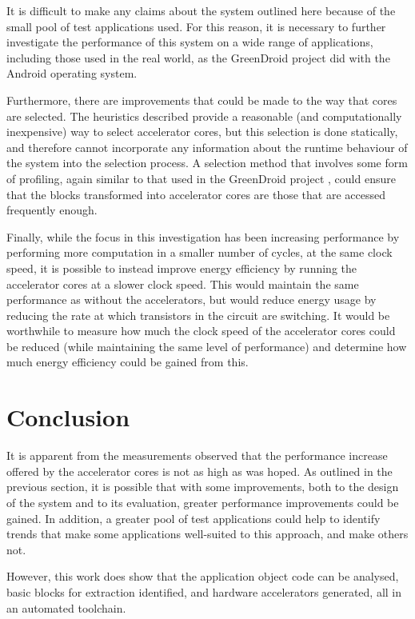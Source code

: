 \documentclass{UoYCSproject}
\begin{document}
It is difficult to make any claims about the system outlined here because of the small pool of test applications used.
For this reason, it is necessary to further investigate the performance of this system on a wide range of applications,
including those used in the real world, as the GreenDroid project \cite{greendroid} did with the Android operating system.

Furthermore, there are improvements that could be made to the way that cores are selected. The heuristics described provide
a reasonable (and computationally inexpensive) way to select accelerator cores, but this selection is done statically, and
therefore cannot incorporate any information about the runtime behaviour of the system into the selection process.
A selection method that involves some form of profiling, again similar to that used in the GreenDroid project \cite{greendroid},
could ensure that the blocks transformed into accelerator cores are those that are accessed frequently enough.

Finally, while the focus in this investigation has been increasing performance by performing more
computation in a smaller number of cycles, at the same clock speed, it is possible to instead improve
energy efficiency by running the accelerator cores at a slower clock speed. This would maintain the same
performance as without the accelerators, but would reduce energy usage by reducing the rate at which
transistors in the circuit are switching. It would be worthwhile to measure how much the clock speed
of the accelerator cores could be reduced (while maintaining the same level of performance) and determine
how much energy efficiency could be gained from this.

\section{Conclusion}

It is apparent from the measurements observed that the performance increase offered by the accelerator cores is not
as high as was hoped. As outlined in the previous section, it is possible that with some improvements,
both to the design of the system and to its evaluation, greater performance improvements could be gained.
In addition, a greater pool of test applications could help to identify trends that make some applications
well-suited to this approach, and make others not.

However, this work does show that the application object code can be analysed, basic blocks for extraction
identified, and hardware accelerators generated, all in an automated toolchain.
\end{document}
